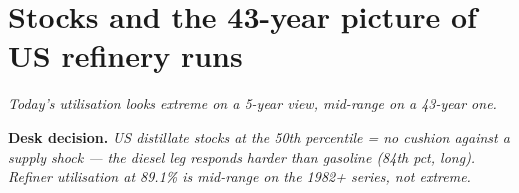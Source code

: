 \documentclass[10pt,a4paper]{article}
\begin{document}
\vspace{0.1cm}

\newpage

\section{Stocks and the 43-year picture of US refinery runs}\label{sec:7}

\textit{Today's utilisation looks extreme on a 5-year view, mid-range on a 43-year one.}

\noindent\textcolor{obred}{\textbf{Desk decision.}} \emph{US distillate stocks at the 50th percentile = no cushion against a supply shock --- the diesel leg responds harder than gasoline (84th pct, long). Refiner utilisation at 89.1\% is mid-range on the 1982+ series, not extreme.}

\vspace{0.2cm}
\end{document}

